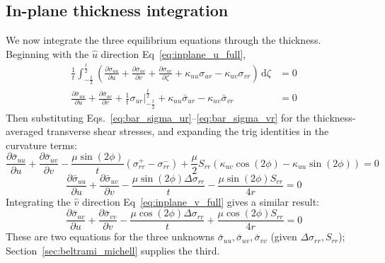\documentclass[11pt]{article}
\begin{document}
\subsection{In-plane thickness integration}\label{sec:thickness_integration}
We now integrate the three equilibrium equations through the thickness. Beginning with the $\hat u$ direction Eq~\eqref{eq:inplane_u_full},
\begin{align}
    \frac{1}{t}\int_{-\frac{t}{2}}^{\frac{t}{2}}\left(\frac{\partial\sigma_{uu}}{\partial u}+\frac{\partial\sigma_{uv}}{\partial v}+\frac{\partial\sigma_{ur}}{\partial\zeta} + \kappa_{uu}\sigma_{ur}-\kappa_{uv}\sigma_{vr}\right)\,\mathrm d\zeta &= 0\\
    \frac{\partial\bar\sigma_{uu}}{\partial u} + \frac{\partial\bar\sigma_{uv}}{\partial v} + \frac{1}{t}\sigma_{ur}\Big|_{-\frac{t}{2}}^{\frac{t}{2}}  + \kappa_{uu}\bar\sigma_{ur} - \kappa_{uv}\bar\sigma_{vr} &= 0
\end{align}
Then substituting Eqs.~\eqref{eq:bar_sigma_ur}--\eqref{eq:bar_sigma_vr} for the thickness-averaged transverse shear stresses, and expanding the trig identities in the curvature terms:
\begin{equation}
    \frac{\partial\bar\sigma_{uu}}{\partial u} + \frac{\partial\bar\sigma_{uv}}{\partial v} - \frac{\mu \sin(2\phi)}{t}\left(\sigma_{rr}^+ -\sigma_{rr}^-\right) + \frac{\mu}{2}S_{rr}\left(\kappa_{uv}\cos(2\phi)-\kappa_{uu}\sin(2\phi)\right) = 0
\end{equation}
\begin{equation}\label{eq:inplane_u_integrated}
    \boxed{\frac{\partial\bar\sigma_{uu}}{\partial u} + \frac{\partial\bar\sigma_{uv}}{\partial v} - \frac{\mu \sin(2\phi)\Delta\sigma_{rr}}{t} - \frac{\mu\sin(2\phi)S_{rr}}{4r} = 0}
\end{equation}
Integrating the $\hat v$ direction Eq~\eqref{eq:inplane_v_full} gives a similar result:
\begin{equation}\label{eq:inplane_v_integrated}
    \boxed{\frac{\partial\bar\sigma_{uv}}{\partial u} + \frac{\partial\bar\sigma_{vv}}{\partial v} - \frac{\mu \cos(2\phi)\Delta \sigma_{rr}}{t} + \frac{\mu\cos(2\phi)S_{rr}}{4r} = 0}
\end{equation}
These are two equations for the three unknowns $\bar\sigma_{uu},\bar\sigma_{uv},\bar\sigma_{vv}$ (given $\Delta\sigma_{rr},S_{rr}$); Section~\ref{sec:beltrami_michell} supplies the third.
\end{document}
